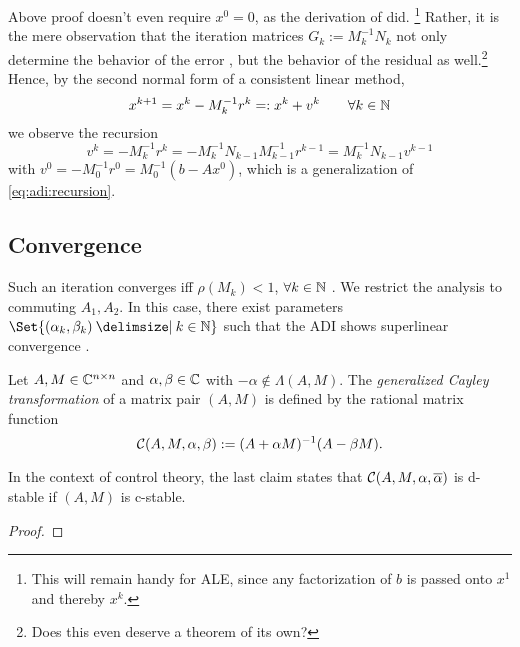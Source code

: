 Above proof doesn't even require $x^0=0$,
as the derivation of \cite{Li2002} did.%
\footnote{%
  This will remain handy for \ac{ALE},
  since any factorization of $b$ is passed onto $x^1$ and thereby $x^k$.
}
Rather, it is the mere observation that the iteration matrices $G_k := M_k^{-1} N_k$
not only determine the behavior of the error \cite[Equation~(11.2.7)]{Golub2013},
but the behavior of the residual as well.\footnote{Does this even deserve a theorem of its own?}
Hence, by the second normal form of a consistent linear method,
\begin{equation*}
  x^{k+1} = x^k - M_k^{-1} r^k =: x^k + v^k
  \qquad
  \forall k\in\mathbb{N}
\end{equation*}
we observe the recursion
\begin{equation*}
  v^k
  = -M_k^{-1} r^k
  = -M_k^{-1} N_{k-1} M_{k-1}^{-1} r^{k-1}
  = M_k^{-1} N_{k-1} v^{k-1}
\end{equation*}
with $v^0 = -M_0^{-1} r^0 = M_0^{-1} (b-Ax^0)$,
which is a generalization of \eqref{eq:adi:recursion}.

\subsection{Convergence}

Such an iteration converges iff $\rho(M_k) < 1$, $\forall k\in\mathbb{N}$ \cite[Theorem~11.2.1]{Golub2013}.
We restrict the analysis to commuting $A_1, A_2$.
In this case,
there exist parameters $\Set{(\alpha_k, \beta_k) \given k\in\N}$
such that the \ac{ADI} shows
superlinear convergence \cite{Beckermann2010}.

\begin{lemma}
\label{thm:adi:cayley}
  Let $A, M\in\mathbb{C}^{n\times n}$ and $\alpha, \beta \in\mathbb{C}$ with $-\alpha\notin\Lambda(A, M)$.
  The \emph{generalized Cayley transformation} of a matrix pair $(A,M)$ is defined by
  the rational matrix function
  \begin{equation*}
    \mathcal{C}(A, M, \alpha, \beta) := (A+\alpha M)^{-1} (A-\beta M).
  \end{equation*}
\end{lemma}
\begin{remark}
  In the context of control theory,
  the last claim states that
  $\Cayley(A, M, \alpha, \conj\alpha)$ is d-stable if
  $(A, M)$ is c-stable.
\end{remark}
\begin{proof}
\end{proof}

